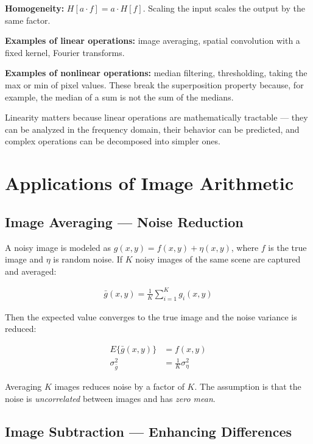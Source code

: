 \documentclass[11pt]{article}
\begin{document}
\textbf{Homogeneity:} $H[a \cdot f] = a \cdot H[f]$. Scaling the input scales the output by the same factor.

\textbf{Examples of linear operations:} image averaging, spatial convolution with a fixed kernel, Fourier transforms.

\textbf{Examples of nonlinear operations:} median filtering, thresholding, taking the max or min of pixel values. These break the superposition property because, for example, the median of a sum is not the sum of the medians.

Linearity matters because linear operations are mathematically tractable --- they can be analyzed in the frequency domain, their behavior can be predicted, and complex operations can be decomposed into simpler ones.

\newpage
\section{Applications of Image Arithmetic}

\subsection{Image Averaging --- Noise Reduction}

A noisy image is modeled as $g(x,y) = f(x,y) + \eta(x,y)$, where $f$ is the true image and $\eta$ is random noise. If $K$ noisy images of the same scene are captured and averaged:

\begin{align}
    \bar{g}(x,y) = \frac{1}{K}\sum_{i=1}^{K} g_i(x,y)
\end{align}

Then the expected value converges to the true image and the noise variance is reduced:

\begin{align}
    E\{\bar{g}(x,y)\} &= f(x,y) \\
    \sigma^2_{\bar{g}} &= \frac{1}{K}\sigma^2_{\eta}
\end{align}

Averaging $K$ images reduces noise by a factor of $K$. The assumption is that the noise is \textit{uncorrelated} between images and has \textit{zero mean}.

\subsection{Image Subtraction --- Enhancing Differences}
\end{document}
